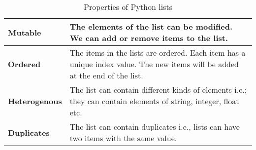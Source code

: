 \begin{table}[h!]
	\centering
	\begin{tabular}{|l|>{\raggedright\arraybackslash}p{10cm}|}
		\hline
		\textbf{Mutable} & The elements of the list can be modified. We can add or remove items to the list. \\
		\hline
		\textbf{Ordered} & The items in the lists are ordered. Each item has a unique index value. The new items will be added at the end of the list. \\
		\hline
		\textbf{Heterogenous} & The list can contain different kinds of elements i.e.; they can contain elements of string, integer, float etc. \\
		\hline
		\textbf{Duplicates} & The list can contain duplicates i.e., lists can have two items with the same value. \\
		\hline
	\end{tabular}
	\caption{Properties of Python lists}
\end{table}